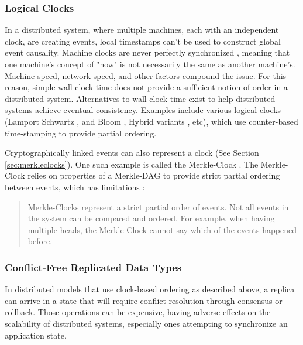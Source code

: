 \documentclass{textile}
\begin{document}
\subsubsection{Logical Clocks}\label{sec:LogicalClocks}

In a distributed system, where multiple machines, each with an independent clock, are creating events, local timestamps can't be used to construct global event causality. Machine clocks are never perfectly synchronized \cite{lamportTimeClocksOrdering1978}, meaning that one machine's concept of "now" is not necessarily the same as another machine's. Machine speed, network speed, and other factors compound the issue. For this reason, simple wall-clock time does not provide a sufficient notion of order in a distributed system. Alternatives to wall-clock time exist to help distributed systems achieve eventual consistency. Examples include various logical clocks (Lamport \cite{lamportTimeClocksOrdering1978} Schwartz \cite{schwarzDetectingCausalRelationships1994}, and Bloom \cite{ramabajaBloomClock2019}, Hybrid variants \cite{kulkarniLogicalPhysicalClocks2014}, etc), which use counter-based time-stamping to provide partial ordering. 

Cryptographically linked events can also represent a clock (See Section \ref{sec:merkleclocks}). One such example is called the Merkle-Clock \cite{sanjuanMerkleCRDTs2019}. The Merkle-Clock relies on properties of a Merkle-DAG to provide strict partial ordering between events, which has limitations \cite[sec. 4.3]{sanjuanMerkleCRDTs2019}:

\begin{quote}
Merkle-Clocks represent a strict partial order of events. Not all events in the system can be compared and ordered. For example, when having multiple heads, the Merkle-Clock cannot say which of the events happened before.
\end{quote}

\subsubsection{Conflict-Free Replicated Data Types}\label{sec:CRDTs}

In distributed models that use clock-based ordering as described above, a replica can arrive in a state that will require conflict resolution through consensus or rollback. Those operations can be expensive, having adverse effects on the scalability of distributed systems, especially ones attempting to synchronize an application state. 
\end{document}

